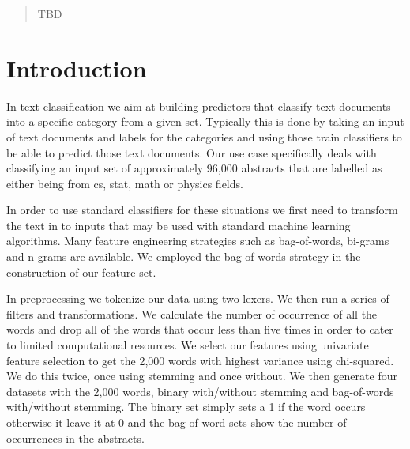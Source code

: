 \documentclass{acm_proc_article-sp}
\begin{document}
\date{30 July 1999}

\maketitle
\begin{abstract}
TBD
\end{abstract}

%
%

\section{Introduction}
In text classification we aim at building predictors that classify text documents into a specific category from a given set. Typically this is done by taking an input of text documents and labels for the categories and using those train classifiers to be able to predict those text documents. Our use case specifically deals with classifying an input set of approximately 96,000 abstracts that are labelled as either being from cs, stat, math or physics fields. 

In order to use standard classifiers for these situations we first need to transform the text in to inputs that may be used with standard machine learning algorithms. Many feature engineering strategies such as bag-of-words, bi-grams and n-grams are available. We employed the bag-of-words strategy in the construction of our feature set. 

In preprocessing we tokenize our data using two lexers. We then run a series of filters and transformations. We calculate the number of occurrence of all the words and drop all of the words that occur less than five times in order to cater to limited computational resources. We select our features using univariate feature selection to get the 2,000 words with highest variance using chi-squared. We do this twice, once using stemming and once without. We then generate four datasets with the 2,000 words, binary with/without stemming and bag-of-words with/without stemming. The binary set simply sets a 1 if the word occurs otherwise it leave it at 0 and the bag-of-word sets show the number of occurrences in the abstracts. 
\end{document}

